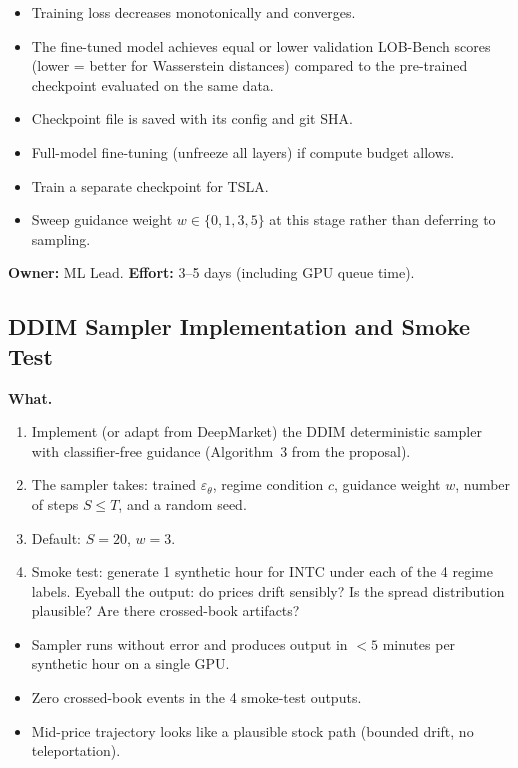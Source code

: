 \documentclass[11pt,a4paper]{article}
\begin{document}
\begin{successbox}
  \begin{itemize}[nosep]
    \item Training loss decreases monotonically and converges.
    \item The fine-tuned model achieves equal or lower validation LOB-Bench scores (lower = better for Wasserstein distances) compared to the pre-trained checkpoint evaluated on the same data.
    \item Checkpoint file is saved with its config and git SHA.
  \end{itemize}
\end{successbox}

\begin{deepbox}
  \begin{itemize}[nosep]
    \item Full-model fine-tuning (unfreeze all layers) if compute budget allows.
    \item Train a separate checkpoint for TSLA.
    \item Sweep guidance weight $w \in \{0, 1, 3, 5\}$ at this stage rather than deferring to sampling.
  \end{itemize}
\end{deepbox}

\textbf{Owner:} ML Lead. \quad \textbf{Effort:} 3--5 days (including GPU queue time).

\subsection{DDIM Sampler Implementation and Smoke Test}

\textbf{What.}
\begin{enumerate}[nosep]
  \item Implement (or adapt from DeepMarket) the DDIM deterministic sampler with classifier-free guidance (Algorithm~3 from the proposal).
  \item The sampler takes: trained $\varepsilon_\theta$, regime condition $c$, guidance weight $w$, number of steps $S \leq T$, and a random seed.
  \item Default: $S = 20$, $w = 3$.
  \item Smoke test: generate 1 synthetic hour for INTC under each of the 4 regime labels.  Eyeball the output: do prices drift sensibly?  Is the spread distribution plausible?  Are there crossed-book artifacts?
\end{enumerate}

\begin{successbox}
  \begin{itemize}[nosep]
    \item Sampler runs without error and produces output in $< 5$ minutes per synthetic hour on a single GPU.
    \item Zero crossed-book events in the 4 smoke-test outputs.
    \item Mid-price trajectory looks like a plausible stock path (bounded drift, no teleportation).
  \end{itemize}
\end{successbox}
\end{document}
